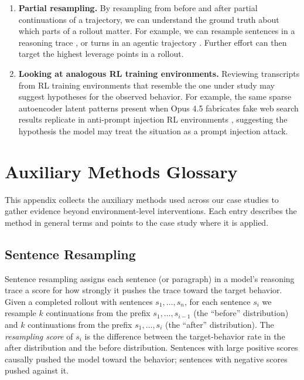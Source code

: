 \documentclass{article}
\begin{document}
\begin{enumerate}
\item \textbf{Partial resampling.} By resampling from before and after partial continuations of a trajectory, we can understand the ground truth about which parts of a rollout matter. For example, we can resample sentences in a reasoning trace \citep{bogdan2025thoughtanchors}, or turns in an agentic trajectory \citep{kroiz2026principled}. Further effort can then target the highest leverage points in a rollout.

\item \textbf{Looking at analogous RL training environments.} Reviewing transcripts from RL training environments that resemble the one under study may suggest hypotheses for the observed behavior. For example, the same sparse autoencoder latent patterns present when Opus 4.5 fabricates fake web search results replicate in anti-prompt injection RL environments \citep{anthropic2025opus45systemcard}, suggesting the hypothesis the model may treat the situation as a prompt injection attack.
\end{enumerate}

\section{Auxiliary Methods Glossary}
\label{app:auxiliary-methods}

This appendix collects the auxiliary methods used across our case studies to gather evidence beyond environment-level interventions. Each entry describes the method in general terms and points to the case study where it is applied.

\subsection{Sentence Resampling}
\label{app:aux:sentence-resampling}

Sentence resampling assigns each sentence (or paragraph) in a model's reasoning trace a score for how strongly it pushes the trace toward the target behavior. Given a completed rollout with sentences $s_1, \dots, s_n$, for each sentence $s_i$ we resample $k$ continuations from the prefix $s_1, \dots, s_{i-1}$ (the ``before'' distribution) and $k$ continuations from the prefix $s_1, \dots, s_i$ (the ``after'' distribution). The \textit{resampling score} of $s_i$ is the difference between the target-behavior rate in the after distribution and the before distribution. Sentences with large positive scores causally pushed the model toward the behavior; sentences with negative scores pushed against it.
\end{document}
